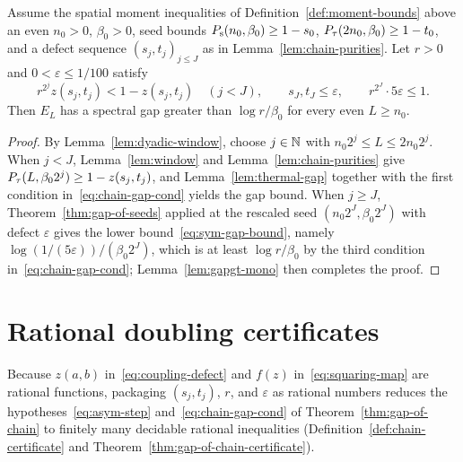 \begin{theorem}
  \label{thm:gap-of-chain}
  \leanok
  Assume the spatial moment inequalities of Definition~\ref{def:moment-bounds} above an even
  \(n_0 > 0\), \(\beta_0 > 0\), seed bounds \(P_{\mathrm{s}}(n_0, \beta_0) \ge 1 - s_0\),
  \(P_{\tau}(2n_0, \beta_0) \ge 1 - t_0\), and a defect sequence \((s_j, t_j)_{j \le J}\) as in
  Lemma~\ref{lem:chain-purities}. Let \(r > 0\) and \(0 < \varepsilon \le 1/100\) satisfy
  \begin{equation}
    \label{eq:chain-gap-cond}
    r^{2^j} z(s_j, t_j) < 1 - z(s_j, t_j) \quad (j < J), \qquad
    s_J, t_J \le \varepsilon, \qquad r^{2^J} \cdot 5\varepsilon \le 1.
  \end{equation}
  Then \(E_L\) has a spectral gap greater than \(\log r / \beta_0\) for every even \(L \ge n_0\).
\end{theorem}
\begin{proof}
  \leanok
  By Lemma~\ref{lem:dyadic-window}, choose \(j \in \mathbb{N}\) with \(n_0 2^j \le L \le 2 n_0 2^j\). When
  \(j < J\), Lemma~\ref{lem:window} and Lemma~\ref{lem:chain-purities} give
  \(P_{\tau}(L, \beta_0 2^j) \ge 1 - z(s_j, t_j)\), and Lemma~\ref{lem:thermal-gap} together with the
  first condition in~\eqref{eq:chain-gap-cond} yields the gap bound. When \(j \ge J\),
  Theorem~\ref{thm:gap-of-seeds} applied at the rescaled seed \((n_0 2^J, \beta_0 2^J)\) with
  defect \(\varepsilon\) gives the lower bound~\eqref{eq:sym-gap-bound}, namely
  \(\log(1/(5\varepsilon)) / (\beta_0 2^J)\), which is at least \(\log r / \beta_0\) by the third
  condition in~\eqref{eq:chain-gap-cond}; Lemma~\ref{lem:gapgt-mono} then completes the proof.
\end{proof}

\section{Rational doubling certificates}

Because \(z(a, b)\) in~\eqref{eq:coupling-defect} and \(f(z)\) in~\eqref{eq:squaring-map} are
rational functions, packaging \((s_j, t_j)\), \(r\), and \(\varepsilon\) as rational numbers reduces
the hypotheses~\eqref{eq:asym-step} and~\eqref{eq:chain-gap-cond} of Theorem~\ref{thm:gap-of-chain}
to finitely many decidable rational inequalities (Definition~\ref{def:chain-certificate} and
Theorem~\ref{thm:gap-of-chain-certificate}).

